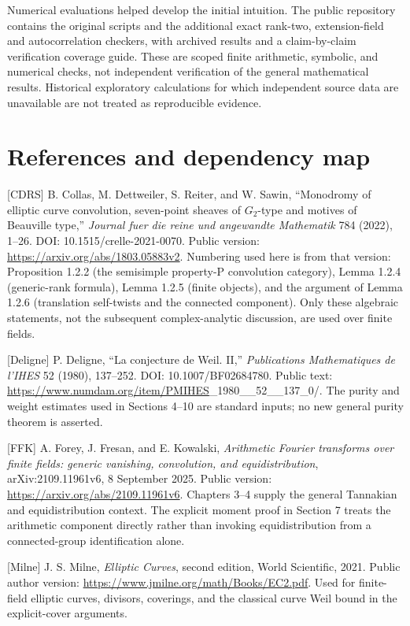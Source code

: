 \documentclass[
  11pt,
  a4paper,
]{article}
\begin{document}
Numerical evaluations helped develop the initial intuition. The public
repository contains the original scripts and the additional exact
rank-two, extension-field and autocorrelation checkers, with archived
results and a claim-by-claim verification coverage guide. These are scoped finite
arithmetic, symbolic, and numerical checks, not independent verification
of the general mathematical results. Historical exploratory calculations
for which independent source data are unavailable are not treated as
reproducible evidence.

\section{References and dependency
map}\label{references-and-dependency-map}

{[}CDRS{]} B. Collas, M. Dettweiler, S. Reiter, and W. Sawin,
``Monodromy of elliptic curve convolution, seven-point sheaves of
\(G_2\)-type and motives of Beauville type,'' \emph{Journal fuer die
reine und angewandte Mathematik} 784 (2022), 1--26. DOI:
10.1515/crelle-2021-0070. Public version:
\url{https://arxiv.org/abs/1803.05883v2}. Numbering used here is from that
version: Proposition 1.2.2 (the semisimple property-P convolution
category), Lemma 1.2.4 (generic-rank formula), Lemma 1.2.5 (finite
objects), and the argument of Lemma 1.2.6 (translation self-twists and
the connected component). Only these algebraic statements, not the
subsequent complex-analytic discussion, are used over finite fields.

{[}Deligne{]} P. Deligne, ``La conjecture de Weil. II,''
\emph{Publications Mathematiques de l'IHES} 52 (1980), 137--252. DOI:
10.1007/BF02684780. Public text:
\url{https://www.numdam.org/item/PMIHES}\_1980\_\_52\_\_137\_0/. The purity
and weight estimates used in Sections 4--10 are standard inputs; no new
general purity theorem is asserted.

{[}FFK{]} A. Forey, J. Fresan, and E. Kowalski, \emph{Arithmetic Fourier
transforms over finite fields: generic vanishing, convolution, and
equidistribution}, arXiv:2109.11961v6, 8 September 2025. Public version:
\url{https://arxiv.org/abs/2109.11961v6}. Chapters 3--4 supply the general
Tannakian and equidistribution context. The explicit moment proof in
Section 7 treats the arithmetic component directly rather than invoking
equidistribution from a connected-group identification alone.

{[}Milne{]} J. S. Milne, \emph{Elliptic Curves}, second edition, World
Scientific, 2021. Public author version:
\url{https://www.jmilne.org/math/Books/EC2.pdf}. Used for finite-field
elliptic curves, divisors, coverings, and the classical curve Weil bound
in the explicit-cover arguments.
\end{document}
